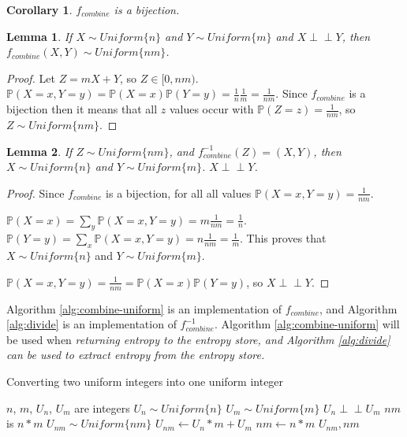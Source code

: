 \documentclass[12pt]{article}
\newtheorem{lemma}{Lemma}
\newtheorem{corollary}{Corollary}
\newcommand{\indep}{\perp\!\!\!\perp}
\begin{document}
\begin{corollary}
    $f_{combine}$ is a bijection.
\end{corollary}

\begin{lemma}
    If $X \sim Uniform\{n\}$ and $Y \sim Uniform\{m\}$ and $X \indep Y$, then 
    $f_{combine}(X,Y) \sim Uniform \{nm\}$.
\end{lemma}

\begin{proof}
    Let $Z = mX+Y$, so $Z \in [0,nm)$. $\mathbb{P}(X=x,Y=y) = \mathbb{P}(X=x)\mathbb{P}(Y=y) = \frac{1}{n}\frac{1}{m} = \frac{1}{nm}$. Since $f_{combine}$ is a bijection then it means that all $z$ values occur with $\mathbb{P}(Z=z) = \frac{1}{nm}$, so $Z \sim Uniform\{nm\}$.
    
\end{proof}

\begin{lemma}
    If $Z \sim Uniform \{nm\}$, and $f^{-1}_{combine}(Z) = (X,Y)$, then $X \sim Uniform\{n\}$ and $Y \sim Uniform\{m\}$. $X \indep Y$.
    \label{lem:combine-independent}
\end{lemma}

\begin{proof}
    Since $f_{combine}$ is a bijection, for all all values $\mathbb{P}(X=x,Y=y) = \frac{1}{nm}$.

    $\mathbb{P}(X=x) = \sum_{y}\mathbb{P}(X=x,Y=y) = m\frac{1}{nm} = \frac{1}{n}$. $\mathbb{P}(Y=y) = \sum_{x}\mathbb{P}(X=x,Y=y) = n\frac{1}{nm} = \frac{1}{m}$. This proves that $X\sim Uniform\{n\}$ and $Y\sim Uniform\{m\}$.

    $\mathbb{P}(X=x,Y=y) = \frac{1}{nm} = \mathbb{P}(X=x)\mathbb{P}(Y=y)$, so $X \indep Y$.
\end{proof}

Algorithm \ref{alg:combine-uniform} is an implementation of $f_{combine}$, and Algorithm \ref{alg:divide} is an implementation of $f^{-1}_{combine}$. Algorithm \ref{alg:combine-uniform} will be used when \em returning \em entropy to the entropy store, and Algorithm \ref{alg:divide} can be used to extract entropy from the entropy store.

\begin{algorithm}
\caption{Converting two uniform integers into one uniform integer}
\label{alg:combine-uniform}
\begin{algorithmic}[1]
    \Require $n$, $m$, $U_n$, $U_m$ are integers
    \Require $U_n \sim Uniform\{n\}$
    \Require $U_m \sim Uniform\{m\}$
    \Require $U_n \indep U_m$
    \Ensure $nm$ is $n * m$
    \Ensure $U_{nm} \sim Uniform\{nm\}$
  \State $U_{nm} \gets U_n * m + U_m$
  \State $nm \gets n * m$
  \State \Return $U_{nm}, nm$
\EndProcedure
\end{algorithmic}
\end{algorithm}
\end{document}
